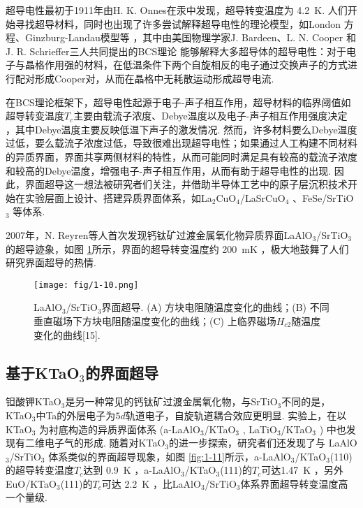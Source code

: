 \documentclass[12pt,a4paper,openany,twoside,UTF-8]{book}
\begin{document}
超导电性最初于1911年由H. K. Onnes在汞中发现，超导转变温度为 \SI{4.2}{K}. 人们开始寻找超导材料，同时也出现了许多尝试解释超导电性的理论模型，如London 方程、Ginzburg-Landau模型等 \cite{ref16}，其中由美国物理学家J. Bardeen、L. N. Cooper 和J. R. Schrieffer三人共同提出的BCS理论 \cite{ref17}能够解释大多超导体的超导电性：对于电子与晶格作用强的材料，在低温条件下两个自旋相反的电子通过交换声子的方式进行配对形成Cooper对，从而在晶格中无耗散运动形成超导电流. 

在BCS理论框架下，超导电性起源于电子-声子相互作用，超导材料的临界阈值如超导转变温度$T_c$主要由载流子浓度、Debye温度以及电子-声子相互作用强度决定 \cite{ref18}，其中Debye温度主要反映低温下声子的激发情况. 然而，许多材料要么Debye温度过低，要么载流子浓度过低，导致很难出现超导电性；如果通过人工构建不同材料的异质界面，界面共享两侧材料的特性，从而可能同时满足具有较高的载流子浓度和较高的Debye温度，增强电子-声子相互作用，从而有助于超导电性的出现. 因此，界面超导这一想法被研究者们关注，并借助半导体工艺中的原子层沉积技术开始在实验层面上设计、搭建异质界面体系，如La$_2$CuO$_4$/LaSrCuO$_4$ \cite{ref19}、FeSe/SrTiO$_3$ \cite{ref20}等体系. 

2007年，N. Reyren等人首次发现钙钛矿过渡金属氧化物异质界面LaAlO$_3$/SrTiO$_3$ 的超导迹象，如图 \ref{fig:1-10}所示，界面的超导转变温度约 \SI{200}{mK} \cite{ref15}，极大地鼓舞了人们研究界面超导的热情.

\begin{figure}[htbp]
\centering
\texttt{[image: fig/1-10.png]}
\caption{LaAlO$_3$/SrTiO$_3$界面超导. (A) 方块电阻随温度变化的曲线；(B) 不同垂直磁场下方块电阻随温度变化的曲线；(C) 上临界磁场$H_{c2}$随温度变化的曲线[15].}
\label{fig:1-10} 
\end{figure}

\subsection{基于KTaO$_3$的界面超导}
钽酸钾KTaO$_3$是另一种常见的钙钛矿过渡金属氧化物，与SrTiO$_3$不同的是， KTaO$_3$中Ta的外层电子为$5d$轨道电子，自旋轨道耦合效应更明显. 实验上，在以 KTaO$_3$ 为衬底构造的异质界面体系 (a-LaAlO$_3$/KTaO$_3$ \cite{ref13}, LaTiO$_3$/KTaO$_3$ \cite{ref14}) 中也发现有二维电子气的形成. 随着对KTaO$_3$的进一步探索，研究者们还发现了与 LaAlO$_3$/SrTiO$_3$ 体系类似的界面超导现象，如图 \ref{fig:1-11}所示，a-LaAlO$_3$/KTaO$_3$(110)的超导转变温度$T_c$达到 \SI{0.9} {K} \cite{ref21}，a-LaAlO$_3$/KTaO$_3$(111)的$T_c$可达\SI{1.47} {K} \cite{ref22}，另外 EuO/KTaO$_3$(111)的$T_c$可达 \SI{2.2}{K} \cite{ref22} ，比LaAlO$_3$/SrTiO$_3$体系界面超导转变温度高一个量级.
\end{document}
